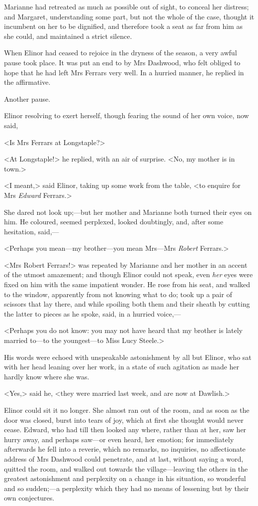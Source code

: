 Marianne had retreated as much as possible out of sight, to conceal her distress; and Margaret, understanding some part, but not the whole of the case, thought it incumbent on her to be dignified, and therefore took a seat as far from him as she could, and maintained a strict silence.

When Elinor had ceased to rejoice in the dryness of the season, a very awful pause took place. It was put an end to by Mrs Dashwood, who felt obliged to hope that he had left Mrs Ferrars very well. In a hurried manner, he replied in the affirmative.

Another pause.

Elinor resolving to exert herself, though fearing the sound of her own voice, now said,

<Is Mrs Ferrars at Longstaple?>

<At Longstaple!> he replied, with an air of surprise. <No, my mother is in town.>

<I meant,> said Elinor, taking up some work from the table, <to enquire for Mrs \textit{Edward} Ferrars.>

She dared not look up;—but her mother and Marianne both turned their eyes on him. He coloured, seemed perplexed, looked doubtingly, and, after some hesitation, said,—

<Perhaps you mean—my brother—you mean Mrs—Mrs \textit{Robert} Ferrars.>

<Mrs Robert Ferrars!> was repeated by Marianne and her mother in an accent of the utmost amazement; and though Elinor could not speak, even \textit{her} eyes were fixed on him with the same impatient wonder. He rose from his seat, and walked to the window, apparently from not knowing what to do; took up a pair of scissors that lay there, and while spoiling both them and their sheath by cutting the latter to pieces as he spoke, said, in a hurried voice,—

<Perhaps you do not know: you may not have heard that my brother is lately married to—to the youngest—to Miss Lucy Steele.>

His words were echoed with unspeakable astonishment by all but Elinor, who sat with her head leaning over her work, in a state of such agitation as made her hardly know where she was.

<Yes,> said he, <they were married last week, and are now at Dawlish.>

Elinor could sit it no longer. She almost ran out of the room, and as soon as the door was closed, burst into tears of joy, which at first she thought would never cease. Edward, who had till then looked any where, rather than at her, saw her hurry away, and perhaps saw—or even heard, her emotion; for immediately afterwards he fell into a reverie, which no remarks, no inquiries, no affectionate address of Mrs Dashwood could penetrate, and at last, without saying a word, quitted the room, and walked out towards the village—leaving the others in the greatest astonishment and perplexity on a change in his situation, so wonderful and so sudden;—a perplexity which they had no means of lessening but by their own conjectures.